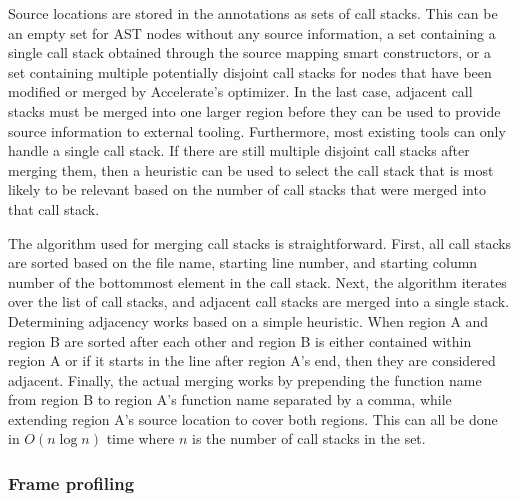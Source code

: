 \documentclass[fontsize=11pt,a4paper,parskip=half,numbers=noenddot]{scrartcl}
\begin{document}
Source locations are stored in the annotations as sets of call stacks. This can
be an empty set for AST nodes without any source information, a set containing a
single call stack obtained through the source mapping smart constructors, or a
set containing multiple potentially disjoint call stacks for nodes that have
been modified or merged by Accelerate's optimizer. In the last case, adjacent
call stacks must be merged into one larger region before they can be used to
provide source information to external tooling. Furthermore, most existing tools
can only handle a single call stack. If there are still multiple disjoint call
stacks after merging them, then a heuristic can be used to select the call stack
that is most likely to be relevant based on the number of call stacks that were
merged into that call stack.

The algorithm used for merging call stacks is straightforward. First, all call
stacks are sorted based on the file name, starting line number, and starting
column number of the bottommost element in the call stack. Next, the algorithm
iterates over the list of call stacks, and adjacent call stacks are merged into
a single stack. Determining adjacency works based on a simple heuristic. When
region A and region B are sorted after each other and region B is either
contained within region A or if it starts in the line after region A's end, then
they are considered adjacent. Finally, the actual merging works by prepending
the function name from region B to region A's function name separated by a
comma, while extending region A's source location to cover both regions. This
can all be done in $O(n \log n)$ time where $n$ is the number of call stacks in
the set.

\subsubsection{Frame profiling}

\end{document}
